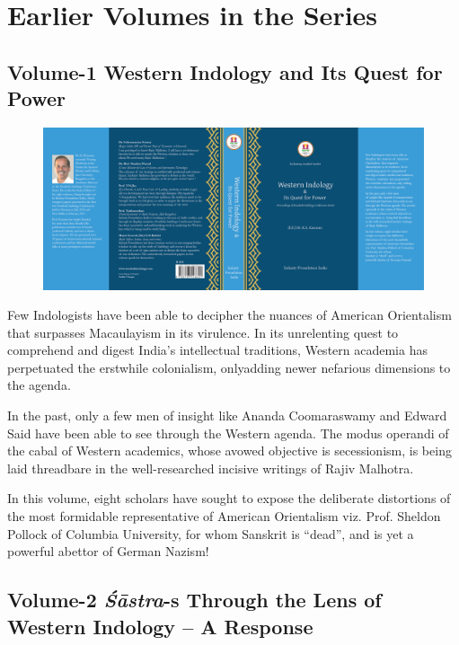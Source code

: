 \chapter*{Earlier Volumes in the Series}\label{evc}

\vspace{-1cm}

\section*{Volume-1 Western Indology and Its Quest for Power}

\begin{figure}[!htbp]
\includegraphics[scale=.727]{images/fig01.png}
\end{figure}

Few Indologists have been able to decipher the nuances of American Orientalism that surpasses Macaulayism in its virulence. In its unrelenting quest to comprehend and digest India’s intellectual traditions, Western academia has perpetuated the erstwhile colonialism, only\break adding newer nefarious dimensions to the agenda. 

In the past, only a few men of insight like Ananda Coomaraswamy and Edward Said have been able to see through the Western agenda. The modus operandi of the cabal of Western academics, whose avowed objective is secessionism, is being laid threadbare in the well-researched incisive writings of Rajiv Malhotra.

In this volume, eight scholars have sought to expose the deliberate distortions of the most formidable representative of American Orientalism viz. Prof. Sheldon Pollock of Columbia University, for whom Sanskrit is “dead”, and is yet a powerful abettor of German Nazism!


\section*{Volume-2 \textit{Śāstra}-s Through the Lens of Western Indology – A Response}


